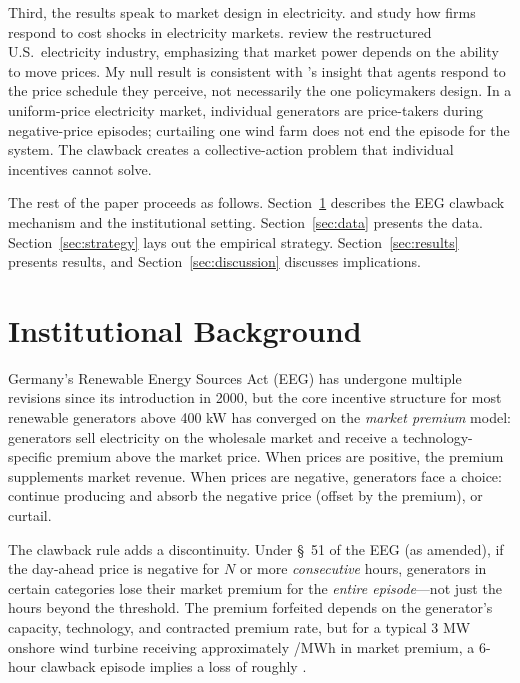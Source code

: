 \documentclass[12pt]{article}
\begin{document}
Third, the results speak to market design in electricity. \citet{Fabra2014} and \citet{Reguant2019} study how firms respond to cost shocks in electricity markets. \citet{BorensteinBushnell2015} review the restructured U.S.\ electricity industry, emphasizing that market power depends on the ability to move prices. My null result is consistent with \citet{Ito2014}'s insight that agents respond to the price schedule they perceive, not necessarily the one policymakers design. In a uniform-price electricity market, individual generators are price-takers during negative-price episodes; curtailing one wind farm does not end the episode for the system. The clawback creates a collective-action problem that individual incentives cannot solve.

The rest of the paper proceeds as follows. Section~\ref{sec:background} describes the EEG clawback mechanism and the institutional setting. Section~\ref{sec:data} presents the data. Section~\ref{sec:strategy} lays out the empirical strategy. Section~\ref{sec:results} presents results, and Section~\ref{sec:discussion} discusses implications.


\section{Institutional Background}
\label{sec:background}

Germany's Renewable Energy Sources Act (EEG) has undergone multiple revisions since its introduction in 2000, but the core incentive structure for most renewable generators above 400 kW has converged on the \emph{market premium} model: generators sell electricity on the wholesale market and receive a technology-specific premium above the market price. When prices are positive, the premium supplements market revenue. When prices are negative, generators face a choice: continue producing and absorb the negative price (offset by the premium), or curtail.

The clawback rule adds a discontinuity. Under \S~51 of the EEG (as amended), if the day-ahead price is negative for $N$ or more \emph{consecutive} hours, generators in certain categories lose their market premium for the \emph{entire episode}---not just the hours beyond the threshold. The premium forfeited depends on the generator's capacity, technology, and contracted premium rate, but for a typical 3 MW onshore wind turbine receiving approximately /MWh in market premium, a 6-hour clawback episode implies a loss of roughly .
\end{document}
